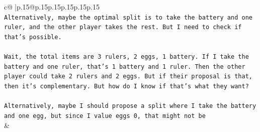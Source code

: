 \documentclass{article}
\begin{document}
{\begin{supertabular}{c@{$\;$}|p{.15\linewidth}@{}p{.15\linewidth}p{.15\linewidth}p{.15\linewidth}p{.15\linewidth}p{.15\linewidth}}
{{{\\ 
\texttt{Alternatively, maybe the optimal split is to take the battery and one ruler, and the other player takes the rest. But I need to check if that's possible.} \\
\\ 
\texttt{Wait, the total items are 3 rulers, 2 eggs, 1 battery. If I take the battery and one ruler, that's 1 battery and 1 ruler. Then the other player could take 2 rulers and 2 eggs. But if their proposal is that, then it's complementary. But how do I know if that's what they want?} \\
\\ 
\texttt{Alternatively, maybe I should propose a split where I take the battery and one egg, but since I value eggs 0, that might not be} \\
            }
        }
    }
    & \\ \\


\end{supertabular}}
\end{document}
